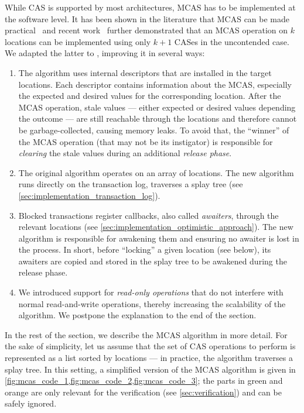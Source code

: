 While CAS is supported by most architectures, MCAS has to be implemented at the software level.
It has been shown in the literature that MCAS can be made practical~\citep{DBLP:conf/wdag/HarrisFP02} and recent work~\citep{DBLP:conf/wdag/GuerraouiKMZ20} further demonstrated that an MCAS operation on $k$ locations can be implemented using only $k + 1$ CASes in the uncontended case.
We adapted the latter to \Kcas, improving it in several ways:
\begin{enumerate}
  \item
    The algorithm uses internal descriptors that are installed in the target locations.
    Each descriptor contains information about the MCAS, especially the expected and desired values for the corresponding location.
    After the MCAS operation, stale values --- either expected or desired values depending the outcome --- are still reachable through the locations and therefore cannot be garbage-collected, causing memory leaks.
    To avoid that, the ``winner'' of the MCAS operation (that may not be its instigator) is responsible for \emph{clearing} the stale values during an additional \emph{release phase}.
  \item
    The original algorithm operates on an array of locations.
    The new algorithm runs directly on the transaction log, \ie traverses a splay tree (see \cref{sec:implementation_transaction_log}).
  \item
    Blocked transactions register callbacks, also called \emph{awaiters}, through the relevant locations (see \cref{sec:implementation_optimistic_approach}).
    The new algorithm is responsible for awakening them and ensuring no awaiter is lost in the process.
    In short, before ``locking'' a given location (see below), its awaiters are copied and stored in the splay tree to be awakened during the release phase.
  \item
    We introduced support for \emph{read-only operations} that do not interfere with normal read-and-write operations, thereby increasing the scalability of the algorithm.
    We postpone the explanation to the end of the section.
\end{enumerate}

In the rest of the section, we describe the MCAS algorithm in more detail.
For the sake of simplicity, let us assume that the set of CAS operations to perform is represented as a list sorted by locations --- in practice, the algorithm traverses a splay tree.
In this setting, a simplified version of the MCAS algorithm is given in \cref{fig:mcas_code_1,fig:mcas_code_2,fig:mcas_code_3}; the parts in green and orange are only relevant for the verification (see \cref{sec:verification}) and can be safely ignored.

